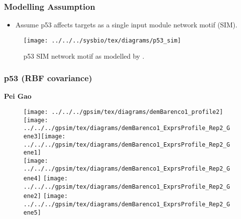 \begin{frame}
  \frametitle{Modelling Assumption}
  \begin{itemize}
  \item Assume p53 affects targets as a single input module network motif
    (SIM).
  \end{itemize}
  \begin{figure}
    \begin{centering}
      \texttt{[image: ../../../sysbio/tex/diagrams/p53\_sim]}
      \par\end{centering}

    \caption{p53 SIM network motif as modelled by \citealt{Barenco:ranked06}.}

  \end{figure}



\end{frame}


\begin{frame}
  \frametitle{p53 (RBF covariance)}

  \begin{flushright}
    \textbf{Pei Gao}
    \par\end{flushright}

  \begin{figure}
    \centering{} \texttt{[image: ../../../gpsim/tex/diagrams/demBarenco1\_profile2]}
    \hfill{}\texttt{[image: ../../../gpsim/tex/diagrams/demBarenco1\_ExprsProfile\_Rep2\_Gene3]}\hfill{}\texttt{[image: ../../../gpsim/tex/diagrams/demBarenco1\_ExprsProfile\_Rep2\_Gene1]}\\
    \texttt{[image: ../../../gpsim/tex/diagrams/demBarenco1\_ExprsProfile\_Rep2\_Gene4]}
    \hfill{}\texttt{[image: ../../../gpsim/tex/diagrams/demBarenco1\_ExprsProfile\_Rep2\_Gene2]}
    \hfill{}\texttt{[image: ../../../gpsim/tex/diagrams/demBarenco1\_ExprsProfile\_Rep2\_Gene5]} 
  \end{figure}



\end{frame}

